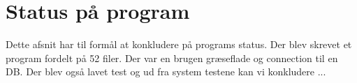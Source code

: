 \section{Status på program} 
\label{sec:status_p_program}

Dette afsnit har til formål at konkludere på programs status. Der blev skrevet et program fordelt på 52 filer. Der var en brugen græseflade og connection til en DB. Der blev også lavet test og ud fra system testene kan vi konkludere ...  